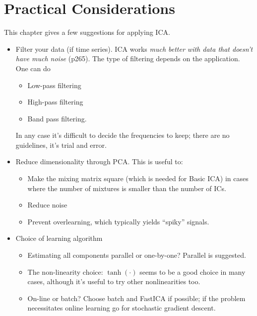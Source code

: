 \documentclass[a4paper, one	side]{book}
\begin{document}




\chapter{Practical Considerations}

This chapter gives a few suggestions for applying ICA. 
\begin{itemize}
\item Filter your data (if time series). ICA works \textit{much better with data that doesn't have much noise} (p265). The type of filtering depends on the application. One can do
	\begin{itemize}
	\item Low-pass filtering
	\item High-pass filtering
	\item Band pass filtering.
	\end{itemize}

In any case it's difficult to decide the frequencies to keep; there are no guidelines, it's trial and error.

\item Reduce dimensionality through PCA. This is useful to:
	\begin{itemize}
	\item Make the mixing matrix square (which is needed for Basic ICA) in cases where the number of mixtures is smaller than the number of ICs.
	\item Reduce noise
	\item Prevent overlearning, which typically yields ``spiky'' signals. 
	\end{itemize}
\item Choice of learning algorithm
	\begin{itemize}
	\item Estimating all components parallel or one-by-one? Parallel is suggested.
	\item The non-linearity choice: $\tanh(\cdot)$ seems to be a good choice in many cases, although it's useful to try other nonlinearities too.
	\item On-line or batch? Choose batch and FastICA if possible; if the problem necessitates online learning go for stochastic gradient descent. 
	\end{itemize}
\end{itemize}
\end{document}

